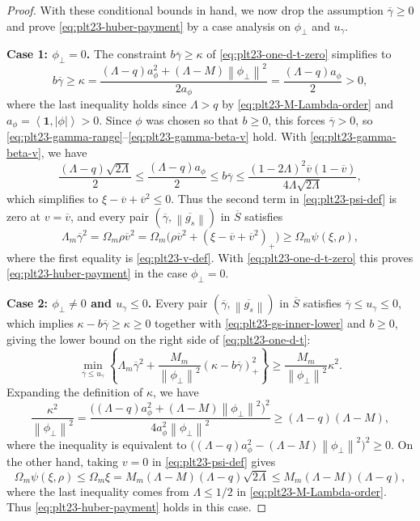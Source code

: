 ﻿\documentclass[11pt]{article}
\numberwithin{equation}{section}
\newcommand{\one}{\mathbf 1}
\newcommand{\ip}[2]{\left\langle #1,#2\right\rangle}
\newcommand{\norm}[1]{\left\lVert #1\right\rVert}
\newcommand{\pos}[1]{\left(#1\right)_{+}}
\begin{document}
\begin{proof}
  With these conditional bounds in hand, we now drop the assumption $\overline\gamma\ge0$ and prove \eqref{eq:plt23-huber-payment} by a case analysis on $\phi_\perp$ and $u_\gamma$.

  \textbf{Case 1: $\phi_\perp=0$.}
  The constraint $b\overline\gamma\ge\kappa$ of \eqref{eq:plt23-one-d-t-zero} simplifies to
  \[
    b\overline\gamma\ge\kappa
    =\frac{(\Lambda-q)a_\phi^2+(\Lambda-M)\norm{\phi_\perp}^2}{2a_\phi}
    =\frac{(\Lambda-q)a_\phi}{2}>0,
  \]
  where the last inequality holds since $\Lambda>q$ by \eqref{eq:plt23-M-Lambda-order} and $a_\phi=\ip\one{|\phi|}>0$.
  Since $\phi$ was chosen so that $b\ge0$, this forces $\overline\gamma>0$, so \eqref{eq:plt23-gamma-range}--\eqref{eq:plt23-gamma-beta-v} hold.
  With \eqref{eq:plt23-gamma-beta-v}, we have
  \[
    \frac{(\Lambda-q)\sqrt{2\Lambda}}{2}
    \le\frac{(\Lambda-q)a_\phi}{2}
    \le b\overline\gamma
    \le\frac{(1-2\Lambda)^2\overline v(1-\overline v)}{4\Lambda\sqrt{2\Lambda}},
  \]
  which simplifies to $\xi-\overline v+\overline v^2\le0$.
  Thus the second term in \eqref{eq:plt23-psi-def} is zero at $v=\overline v$, and every pair $(\overline\gamma,\overline{\norm{g_s}})$ in $\overline S$ satisfies
  \[
    \Lambda_m\overline\gamma^2
    =\Omega_m\rho\overline v^2
    =\Omega_m\bigl(\rho\overline v^2+\pos{\xi-\overline v+\overline v^2}\bigr)
    \ge \Omega_m\psi(\xi,\rho),
  \]
  where the first equality is \eqref{eq:plt23-v-def}.
  With \eqref{eq:plt23-one-d-t-zero} this proves \eqref{eq:plt23-huber-payment} in the case $\phi_\perp=0$.

  \textbf{Case 2: $\phi_\perp\ne0$ and $u_\gamma\le0$.}
  Every pair $(\overline\gamma,\overline{\norm{g_s}})$ in $\overline S$ satisfies $\overline\gamma\le u_\gamma\le0$, which implies $\kappa-b\overline\gamma\ge\kappa\ge0$ together with \eqref{eq:plt23-gs-inner-lower} and $b\ge0$, giving the lower bound on the right side of \eqref{eq:plt23-one-d-t}:
  \[
    \min_{\overline\gamma\le u_\gamma}
    \left\{
    \Lambda_m\overline\gamma^2
    +\frac{M_m}{\norm{\phi_\perp}^2}\pos{\kappa-b\overline\gamma}^2
    \right\}
    \ge\frac{M_m}{\norm{\phi_\perp}^2}\kappa^2.
  \]
  Expanding the definition of $\kappa$, we have
  \[
    \frac{\kappa^2}{\norm{\phi_\perp}^2}
    =\frac{\bigl((\Lambda-q)a_\phi^2+(\Lambda-M)\norm{\phi_\perp}^2\bigr)^2}
    {4a_\phi^2\norm{\phi_\perp}^2}\ge(\Lambda-q)(\Lambda-M),
  \]
  where the inequality is equivalent to $\bigl((\Lambda-q)a_\phi^2-(\Lambda-M)\norm{\phi_\perp}^2\bigr)^2\ge0$.
  On the other hand, taking $v=0$ in \eqref{eq:plt23-psi-def} gives
  \[
    \Omega_m\psi(\xi,\rho)
    \le \Omega_m\xi=M_m(\Lambda-M)(\Lambda-q)\sqrt{2\Lambda}
    \le M_m(\Lambda-M)(\Lambda-q),
  \]
  where the last inequality comes from $\Lambda\le1/2$ in \eqref{eq:plt23-M-Lambda-order}.
  Thus \eqref{eq:plt23-huber-payment} holds in this case.


\end{proof}
\end{document}
